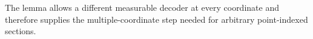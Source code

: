 The lemma allows a different measurable decoder at every coordinate and therefore supplies the multiple-coordinate step needed for arbitrary point-indexed sections.